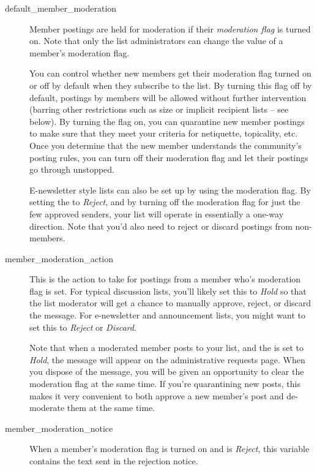 \documentclass{howto}
\begin{document}
\begin{description}
\item[default_member_moderation]
    Member postings are held for moderation if their \emph{moderation
    flag} is turned on.  Note that only the list administrators can
    change the value of a member's moderation flag.

    You can control whether new members get their moderation flag
    turned on or off by default when they subscribe to the list.  By
    turning this flag off by default, postings by members will be
    allowed without further intervention (barring other restrictions
    such as size or implicit recipient lists -- see below).  By
    turning the flag on, you can quarantine new member postings to
    make sure that they meet your criteria for netiquette, topicality,
    etc.  Once you determine that the new member understands the
    community's posting rules, you can turn off their moderation flag
    and let their postings go through unstopped.

    E-newsletter style lists can also be set up by using the
    moderation flag.  By setting the 
    to \emph{Reject}, and by turning off the moderation flag for just
    the few approved senders, your list will operate in essentially a
    one-way direction.  Note that you'd also need to reject or discard
    postings from non-members.

\item[member_moderation_action]
    This is the action to take for postings from a member who's
    moderation flag is set.  For typical discussion lists, you'll
    likely set this to \emph{Hold} so that the list moderator will get
    a chance to manually approve, reject, or discard the message.  For
    e-newsletter and announcement lists, you might want to set this to
    \emph{Reject} or \emph{Discard}.

    Note that when a moderated member posts to your list, and the
     is set to \emph{Hold}, the message
    will appear on the administrative requests page.  When you dispose
    of the message, you will be given an opportunity to clear the
    moderation flag at the same time.   If you're quarantining new
    posts, this makes it very convenient to both approve a new
    member's post and de-moderate them at the same time.

\item[member_moderation_notice]
    When a member's moderation flag is turned on and
     is \emph{Reject}, this variable
    contains the text sent in the rejection notice.
\end{description}
\end{document}
